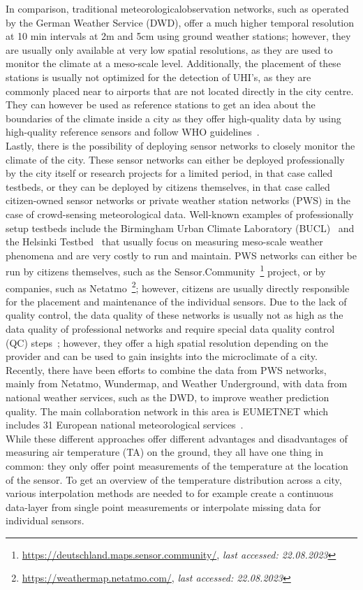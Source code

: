 In comparison, traditional meteorologicalobservation networks, such as operated by the German Weather Service (DWD), offer a much higher temporal resolution at 10 min intervals at 2m and 5cm using ground weather stations; however, they are usually only available at very low spatial resolutions, as they are used to monitor the climate at a meso-scale level. Additionally, the placement of these stations is usually not optimized for the detection of UHI's, as they are commonly placed near to airports that are not located directly in the city centre. They can however be used as reference stations to get an idea about the boundaries of the climate inside a city as they offer high-quality data by using high-quality reference sensors and follow WHO guidelines~\cite{oke2006guideline}.\\
Lastly, there is the possibility of deploying sensor networks to closely monitor the climate of the city. These sensor networks can either be deployed professionally by the city itself or research projects for a limited period, in that case called testbeds, or they can be deployed by citizens themselves, in that case called citizen-owned sensor networks or private weather station networks (PWS) in the case of crowd-sensing meteorological data. Well-known examples of professionally setup testbeds include the Birmingham Urban Climate Laboratory (BUCL)~\cite{chapman2015birmingham} and the Helsinki Testbed~\cite{koskinen2011helsinki} that usually focus on measuring meso-scale weather phenomena and are very costly to run and maintain.
PWS networks can either be run by citizens themselves, such as the Sensor.Community~\footnote{\url{https://deutschland.maps.sensor.community/}, \textit{last accessed: 22.08.2023}} project, or by companies, such as Netatmo~\footnote{\url{https://weathermap.netatmo.com/}, \textit{last accessed: 22.08.2023}}; however, citizens are usually directly responsible for the placement and maintenance of the individual sensors. Due to the lack of quality control, the data quality of these networks is usually not as high as the data quality of professional networks and require special data quality control (QC) steps~\cite{fenner2021crowdqc+, meier2017crowdsourcing}; however, they offer a high spatial resolution depending on the provider and can be used to gain insights into the microclimate of a city. Recently, there have been efforts to combine the data from PWS networks, mainly from Netatmo, Wundermap, and Weather Underground, with data from national weather services, such as the DWD, to improve weather prediction quality. The main collaboration network in this area is EUMETNET which includes 31 European national meteorological services~\cite{hahn2022observations}.\\
While these different approaches offer different advantages and disadvantages of measuring air temperature (TA) on the ground, they all have one thing in common: they only offer point measurements of the temperature at the location of the sensor. To get an overview of the temperature distribution across a city, various interpolation methods are needed to for example create a continuous data-layer from single point measurements or interpolate missing data for individual sensors.

